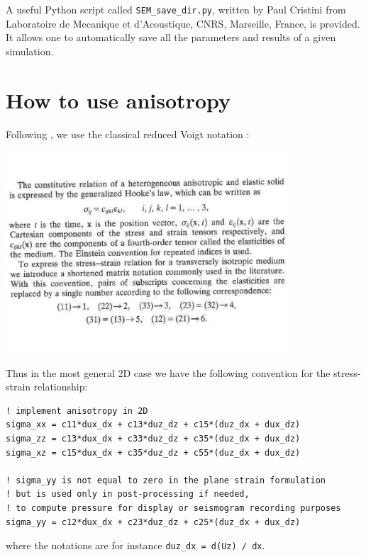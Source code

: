 \documentclass[oneside,english,onecolumn,letterpaper]{book}
\begin{document}
A useful Python script called \texttt{SEM\_save\_dir.py}, written by Paul Cristini from
Laboratoire de Mecanique et d'Acoustique, CNRS, Marseille, France, is provided.
It allows one to automatically save all the parameters and results of a given simulation.

\section{How to use anisotropy}

\begin{flushleft}
Following \cite{CaKoKo88}, we use the classical reduced Voigt notation \citep{Hel94,Car07}:
\end{flushleft}
\noindent \begin{centering}
{\small \includegraphics[width=4.2in,trim=0 2.6cm 0 2.6cm]{figures/Carcione_et_al_aniso_1988_image.pdf} }
\par\end{centering}{\small \par}

\noindent
Thus in the most general 2D case we have the following convention for the stress-strain relationship:
%
\begin{verbatim}
! implement anisotropy in 2D
sigma_xx = c11*dux_dx + c13*duz_dz + c15*(duz_dx + dux_dz)
sigma_zz = c13*dux_dx + c33*duz_dz + c35*(duz_dx + dux_dz)
sigma_xz = c15*dux_dx + c35*duz_dz + c55*(duz_dx + dux_dz)

! sigma_yy is not equal to zero in the plane strain formulation
! but is used only in post-processing if needed,
! to compute pressure for display or seismogram recording purposes
sigma_yy = c12*dux_dx + c23*duz_dz + c25*(duz_dx + dux_dz)
\end{verbatim}
%
where the notations are for instance \texttt{duz\_dx = d(Uz) / dx}.
\end{document}
